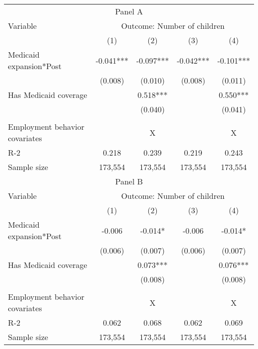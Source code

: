 \begin{tabular}{lcccc}
\toprule
\toprule
 \multicolumn{5}{c}{Panel A} \\
 Variable & \multicolumn{4}{c}{Outcome: Number of children } \\
  & (1) & (2) & (3) &  (4) \\
\midrule 
 Medicaid expansion*Post   & -0.041***   & -0.097***   & -0.042***   & -0.101***  \\
 & (0.008)   & (0.010)   & (0.008)   & (0.011)  \\
 Has Medicaid coverage   &   & 0.518***   &   & 0.550***  \\
 &    & (0.040)   &    & (0.041)  \\
\\
Employment behavior covariates  &  & X &  & X \\
R-2 & 0.218 & 0.239 & 0.219 & 0.243 \\
Sample size & 173,554 & 173,554 & 173,554 & 173,554 \\
\midrule
 \multicolumn{5}{c}{Panel B} \\
 Variable & \multicolumn{4}{c}{Outcome: Number of children } \\
  & (1) & (2) & (3) &  (4) \\
\midrule 
 Medicaid expansion*Post   & -0.006   & -0.014*   & -0.006   & -0.014*  \\
 & (0.006)   & (0.007)   & (0.006)   & (0.007)  \\
 Has Medicaid coverage   &   & 0.073***   &   & 0.076***  \\
 &    & (0.008)   &    & (0.008)  \\
\\
Employment behavior covariates  &  & X &  & X \\
R-2 & 0.062 & 0.068 & 0.062 & 0.069 \\
Sample size & 173,554 & 173,554 & 173,554 & 173,554 \\
\midrule
\bottomrule
\end{tabular}